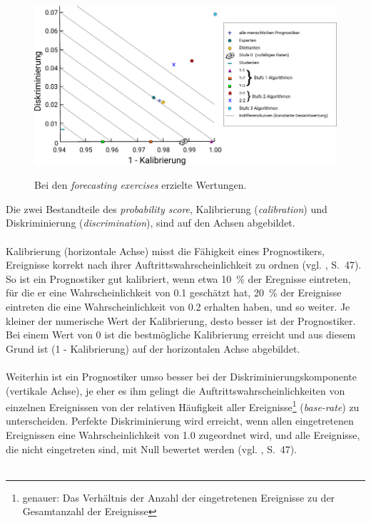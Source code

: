 \begin{figure}%
\centering
\caption{Bei den \emph{forecasting exercises} erzielte Wertungen.}
\includegraphics[scale=1.0]{Grafiken/Tetlock_1_Fertig_Ink.pdf} 
\label{pic:Tetlock_1}
\end{figure}
Die zwei
Bestandteile des \emph{probability score}, Kalibrierung (\emph{calibration}) und
Diskriminierung (\emph{discrimination}), sind auf den Achsen abgebildet. \\ \\ 
Kalibrierung (horizontale Achse) misst die Fähigkeit eines Prognostikers,
Ereignisse korrekt nach ihrer
Auftrittswahrscheinlichkeit zu ordnen (vgl. \cite{Tetlock}, S.~47). So ist ein
Prognostiker gut kalibriert, wenn etwa 10~\% der Eregnisse eintreten, für die
er eine Wahrscheinlichkeit von 0.1 geschätzt hat, 20~\% der Ereignisse eintreten
die eine Wahrscheinlichkeit von 0.2 erhalten haben, und so weiter. Je kleiner
der numerische Wert der Kalibrierung, desto besser ist der Prognostiker. Bei
einem Wert von 0 ist die bestmögliche Kalibrierung erreicht und aus diesem Grund
ist (1 - Kalibrierung) auf der horizontalen Achse abgebildet. \\ \\
Weiterhin ist ein Prognostiker umso besser bei der Diskriminierungskomponente
(vertikale Achse),
je eher es ihm gelingt die Auftrittswahrscheinlichkeiten von einzelnen
Ereignissen von der relativen Häufigkeit aller Ereignisse\footnote{
genauer: Das Verhältnis der Anzahl der eingetretenen Ereignisse zu der
Gesamtanzahl der Ereignisse} (\emph{base-rate})
zu unterscheiden. Perfekte Diskriminierung wird erreicht, wenn allen 
eingetretenen Ereignissen eine Wahrscheinlichkeit von 1.0 zugeordnet wird, und
alle Ereignisse, die nicht eingetreten sind, mit Null bewertet werden
(vgl. \cite{Tetlock}, S.~47).\\ \\
